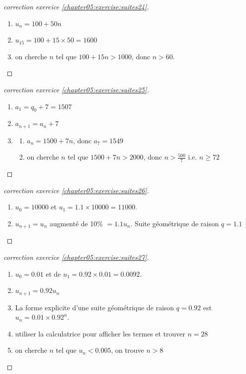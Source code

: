 \documentclass[main.tex]{subfiles}
\begin{document}
% 
\begin{proof}[correction exercice \ref{chapter05:exercise:suites24}] \hfill  \hfill \\ 
\begin{enumerate}[label=\arabic*),leftmargin=*] 
 	\item \colorbox{BurntOrange}{ $u_n=100+50n$}
 	\item \colorbox{BurntOrange}{$u_{15}=100+15\times 50=1600$}
 	\item \colorbox{BurntOrange}{on cherche $n$ tel que $100+15n>1000$, donc $n>60$.}
 \end{enumerate}
\end{proof}

\begin{proof}[correction exercice \ref{chapter05:exercise:suites25}] \hfill  
\begin{enumerate}[label=\arabic*),leftmargin=*] 
	\item  \colorbox{BurntOrange}{$a_1=q_0+7=1507$} 
	\item   \colorbox{BurntOrange}{$a_{n+1}=a_n+7$}
	\item \begin{enumerate}[label=\alph*),leftmargin=*] 
		\item \colorbox{BurntOrange}{$a_{n}=1500+7n$, donc $a_{7}=1549$}  
		\item \colorbox{BurntOrange}{on cherche $n$ tel que $1500+7n>2000$, donc $n>\frac{500}{7}$ i.e. $n\geqslant 72$} 
	\end{enumerate}
\end{enumerate}
\end{proof}

\begin{proof}[correction exercice \ref{chapter05:exercise:suites26}] \hfill  
\begin{enumerate}[label=\arabic*),leftmargin=*] 
	\item   \colorbox{BurntOrange}{$u_0=10000$ et   $u_1=1.1\times 10000=11000$}.
	\item \colorbox{BurntOrange}{$u_{n+1}=u_n$ augmenté de 10\%  $=1.1u_n$. Suite géométrique de raison $q=1.1$ } 
\end{enumerate} 
\end{proof}
\begin{proof}[correction exercice \ref{chapter05:exercise:suites27}] \hfill   
\begin{enumerate}[label=\arabic*),leftmargin=*] 
	\item  \colorbox{BurntOrange}{$u_0=0.01$ et de $u_1=0.92\times 0.01=0.0092$}.
	\item \colorbox{BurntOrange}{$u_{n+1}=0.92u_n$}
	\item \colorbox{BurntOrange}{La forme explicite d'une suite géométrique de raison $q=0.92$ est $u_n=0.01\times 0.92^n$}.
	\item \colorbox{BurntOrange}{utiliser la calculatrice pour afficher les termes et trouver $n=28$} 
	\item \colorbox{BurntOrange}{on cherche $n$ tel que $u_n<0.005$, on trouve $n>8$}
\end{enumerate}

\end{proof}
\end{document}
